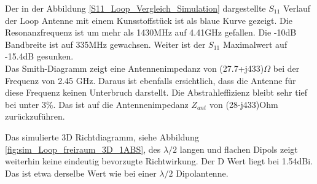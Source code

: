 Der in der  Abbildung \ref{S11_Loop_Vergleich_Simulation} dargestellte $S_{11}$ Verlauf der Loop Antenne mit einem Kunsstoffstück ist als blaue Kurve gezeigt. Die Resonanzfrequenz ist um mehr als 1430MHz auf 4.41GHz gefallen. Die -10dB Bandbreite ist auf 335MHz gewachsen. Weiter ist der $S_{11}$ Maximalwert auf -15.4dB gesunken.\\
Das Smith-Diagramm zeigt eine Antennenimpedanz von (27.7+j433)$\Omega$ bei der Frequenz von 2.45 GHz. Daraus ist ebenfalls ersichtlich, dass die Antenne für diese Frequenz keinen Unterbruch darstellt. Die Abstrahleffizienz bleibt sehr tief bei unter $3\%$. Das ist auf die Antennenimpedanz $Z_{ant}$ von (28-j433)Ohm zurückzuführen.


Das simulierte 3D Richtdiagramm, siehe Abbildung \ref{fig:sim_Loop_freiraum_3D_1ABS}, des $\lambda/2$ langen und flachen Dipols zeigt weiterhin keine eindeutig bevorzugte Richtwirkung. Der D Wert liegt bei 1.54dBi. Das ist etwa derselbe Wert wie bei einer $\lambda/2$ Dipolantenne.\\



